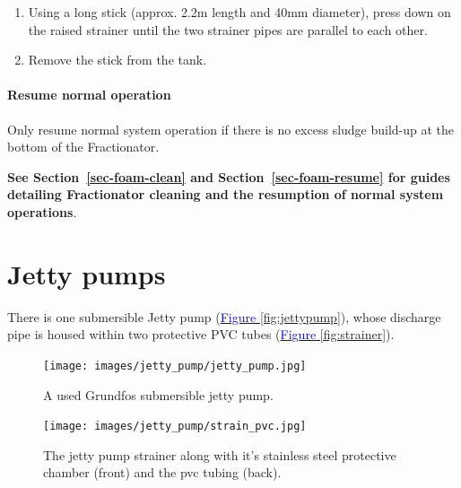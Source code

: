 \documentclass[
  12pt,
]{report}
\providecommand{\tightlist}{%
  \setlength{\itemsep}{0pt}\setlength{\parskip}{0pt}}\usepackage{longtable,booktabs,array}
\begin{document}
\begin{enumerate}
\def\labelenumi{\arabic{enumi}.}
\tightlist
\item
  Using a long stick (approx. 2.2m length and 40mm diameter), press down
  on the raised strainer until the two strainer pipes are parallel to
  each other.
\item
  Remove the stick from the tank.
\end{enumerate}

\hypertarget{resume-normal-operation-2}{%
\subsubsection{Resume normal
operation}\label{resume-normal-operation-2}}

{Only resume normal system operation if there is no excess sludge
build-up at the bottom of the Fractionator}.

\textbf{See Section~\ref{sec-foam-clean} and
Section~\ref{sec-foam-resume} for guides detailing Fractionator cleaning
and the resumption of normal system operations}.

\newpage

\hypertarget{jetty-pumps}{%
\chapter{Jetty pumps}\label{jetty-pumps}}

There is one submersible Jetty pump
(\ul{\textcolor{blue}{Figure \ref{fig:jettypump}}}), whose discharge
pipe is housed within two protective PVC tubes
(\ul{\textcolor{blue}{Figure \ref{fig:strainer}}}).

\begin{figure}[H]

{\centering \texttt{[image: images/jetty\_pump/jetty\_pump.jpg]}

}

\caption{A used Grundfos submersible jetty pump.}

\end{figure}

\begin{figure}[H]

{\centering \texttt{[image: images/jetty\_pump/strain\_pvc.jpg]}

}

\caption{The jetty pump strainer along with it's stainless steel
protective chamber (front) and the pvc tubing (back).}

\end{figure}
\end{document}
